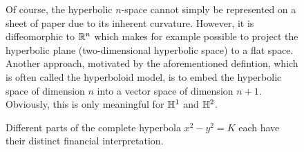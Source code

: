 \begin{figure}
    \centering
    \label{fig:credit_debit}
    \caption{Different parts of the complete hyperbola $x^2  - y^2 = K$ each have their distinct financial interpretation.}

Of course, the hyperbolic $n$-space cannot simply be represented on a sheet of paper due to its inherent curvature. However, it is diffeomorphic to $\mathbb{R}^{n}$ which makes for example possible to project the hyperbolic plane (two-dimensional hyperbolic space) to a flat space. Another approach, motivated by the aforementioned defintion, which is often called the hyperboloid model, is to embed the hyperbolic space of dimension $n$ into a vector space of dimension $n+1$. Obviously, this is only meaningful for $\mathbb{H}^{1}$ and $\mathbb{H}^{2}$. 



\end{figure}
